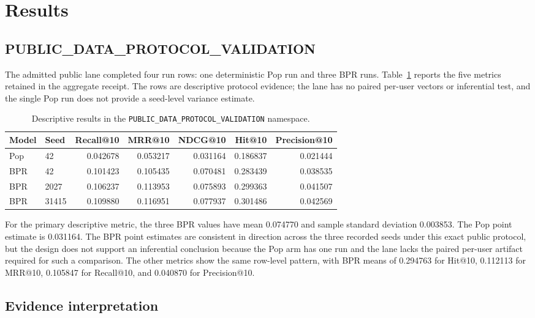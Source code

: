 \documentclass[10pt,a4paper]{article}
\begin{document}
\section{Results}

\subsection{PUBLIC\_DATA\_PROTOCOL\_VALIDATION}

The admitted public lane completed four run rows: one deterministic Pop run and
three BPR runs. Table~\ref{tab:public-validation} reports the five metrics
retained in the aggregate receipt. The rows are descriptive protocol evidence;
the lane has no paired per-user vectors or inferential test, and the single Pop
run does not provide a seed-level variance estimate.

\begin{table}[H]
\centering
\caption{Descriptive results in the \texttt{PUBLIC\_DATA\_PROTOCOL\_VALIDATION} namespace.}
\label{tab:public-validation}
\small
\begin{tabular}{llrrrrr}
\toprule
Model & Seed & Recall@10 & MRR@10 & NDCG@10 & Hit@10 & Precision@10 \\
\midrule
Pop & 42 & 0.042678 & 0.053217 & 0.031164 & 0.186837 & 0.021444 \\
BPR & 42 & 0.101423 & 0.105435 & 0.070481 & 0.283439 & 0.038535 \\
BPR & 2027 & 0.106237 & 0.113953 & 0.075893 & 0.299363 & 0.041507 \\
BPR & 31415 & 0.109880 & 0.116951 & 0.077937 & 0.301486 & 0.042569 \\
\bottomrule
\end{tabular}
\end{table}

For the primary descriptive metric, the three BPR values have mean 0.074770
and sample standard deviation 0.003853. The Pop point estimate is 0.031164.
The BPR point estimates are consistent in direction across the three recorded
seeds under this exact public protocol, but the design does not support an
inferential conclusion because the Pop arm has one run and the lane lacks the
paired per-user artifact required for such a comparison. The other metrics show
the same row-level pattern, with BPR means of 0.294763 for Hit@10, 0.112113 for
MRR@10, 0.105847 for Recall@10, and 0.040870 for Precision@10.

\subsection{Evidence interpretation}
\end{document}
